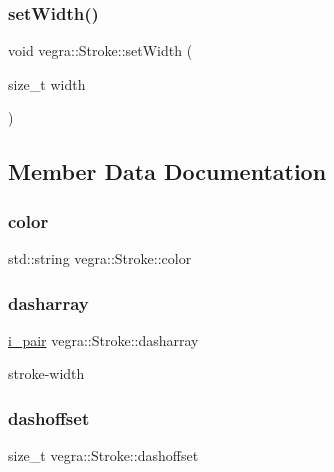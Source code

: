 \subsubsection{\texorpdfstring{set\+Width()}{setWidth()}}
{\footnotesize\ttfamily void vegra\+::\+Stroke\+::set\+Width (\begin{DoxyParamCaption}\item[{size\+\_\+t}]{width }\end{DoxyParamCaption})\hspace{0.3cm}{\ttfamily [inline]}}



\subsection{Member Data Documentation}
\mbox{\label{structvegra_1_1Stroke_a407c59871f2ade9be29d2c5dfe28d21d}} 
\subsubsection{\texorpdfstring{color}{color}}
{\footnotesize\ttfamily std\+::string vegra\+::\+Stroke\+::color}

\mbox{\label{structvegra_1_1Stroke_a649828302bf54741b69ffeca87cbabbf}} 
\subsubsection{\texorpdfstring{dasharray}{dasharray}}
{\footnotesize\ttfamily \mbox{\hyperlink{structvegra_1_1Stroke_af5a2b4ee71962d044ebb7a309b22bb8a}{i\+\_\+pair}} vegra\+::\+Stroke\+::dasharray}



stroke-\/width 

\mbox{\label{structvegra_1_1Stroke_aac202e47f5066fcd16cd4e1b1296214d}} 
\subsubsection{\texorpdfstring{dashoffset}{dashoffset}}
{\footnotesize\ttfamily size\+\_\+t vegra\+::\+Stroke\+::dashoffset}



